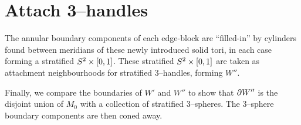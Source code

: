 \section{Attach 3--handles}

The annular boundary components of each edge-block are ``filled-in'' by cylinders found between meridians of these newly introduced solid tori, in each case forming a stratified $S^2\times[0,1]$.
These stratified $S^2\times[0,1]$ are taken as attachment neighbourhoods for stratified 3--handles, forming $W''$.

Finally, we compare the boundaries of $W'$ and $W''$ to show that $\partial W''$ is the disjoint union of  $M_0$ with a collection of stratified 3--spheres.
The 3--sphere boundary components are then coned away.
